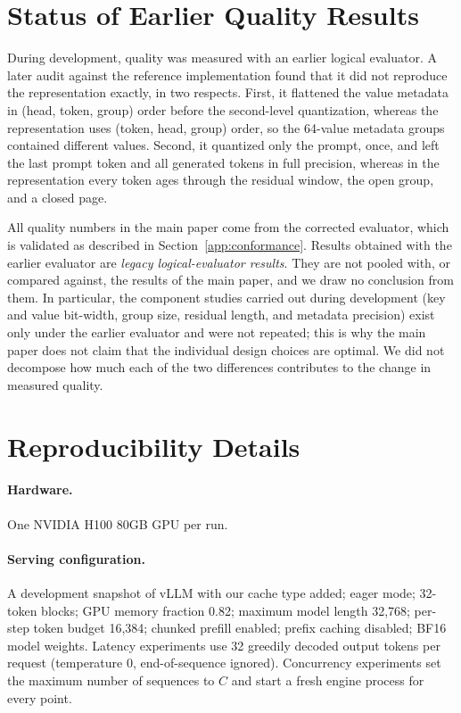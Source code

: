\documentclass{article}
\begin{document}
\section{Status of Earlier Quality Results}
\label{app:legacy}

During development, quality was measured with an earlier logical evaluator. A later audit against the
reference implementation found that it did not reproduce the representation exactly, in two respects.
First, it flattened the value metadata in (head, token, group) order before the second-level
quantization, whereas the representation uses (token, head, group) order, so the 64-value metadata
groups contained different values. Second, it quantized only the prompt, once, and left the last
prompt token and all generated tokens in full precision, whereas in the representation every token
ages through the residual window, the open group, and a closed page.

All quality numbers in the main paper come from the corrected evaluator, which is validated as
described in Section~\ref{app:conformance}. Results obtained with the earlier evaluator are
\emph{legacy logical-evaluator results}. They are not pooled with, or compared against, the results of
the main paper, and we draw no conclusion from them. In particular, the component studies carried out
during development (key and value bit-width, group size, residual length, and metadata precision) exist
only under the earlier evaluator and were not repeated; this is why the main paper does not claim that
the individual design choices are optimal. We did not decompose how much each of the two differences
contributes to the change in measured quality.

\section{Reproducibility Details}
\label{app:repro}

\paragraph{Hardware.}
One NVIDIA H100 80GB GPU per run.

\paragraph{Serving configuration.}
A development snapshot of vLLM with our cache type added; eager mode; 32-token blocks; GPU memory
fraction 0.82; maximum model length 32,768; per-step token budget 16,384; chunked prefill enabled;
prefix caching disabled; BF16 model weights. Latency experiments use 32 greedily decoded output tokens
per request (temperature 0, end-of-sequence ignored). Concurrency experiments set the maximum number of
sequences to $C$ and start a fresh engine process for every point.
\end{document}
